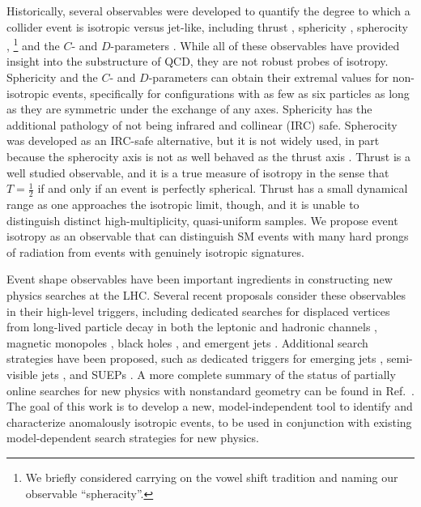 \documentclass[letterpaper,11pt]{article}
\DeclareRobustCommand{\Ref}[1]{Ref.~\cite{#1}}
\begin{document}
Historically, several observables were developed to quantify the degree to which a collider event is isotropic versus jet-like, including thrust \cite{Brandt:1964sa,Farhi:1977sg,DeRujula:1978vmq}, sphericity \cite{Bjorken:1969wi,Ellis:1976uc}, spherocity \cite{Georgi:1977sf},%
%
\footnote{We briefly considered carrying on the vowel shift tradition and naming our observable ``spheracity''.}
%
and the $C$- and $D$-parameters \cite{Parisi:1978eg,Donoghue:1979vi,Ellis:1980wv}.
%
While all of these observables have provided insight into the substructure of QCD, they are not robust probes of isotropy. 
%
Sphericity and the $C$- and $D$-parameters can obtain their extremal values for non-isotropic events, specifically for configurations with as few as six particles as long as they are symmetric under the exchange of any axes.
%
Sphericity has the additional pathology of not being infrared and collinear (IRC) safe.
%
Spherocity was developed as an IRC-safe alternative, but it is not widely used, in part because the spherocity axis is not as well behaved as the thrust axis \cite{Larkoski:2014uqa}. 
%
Thrust is a well studied observable, and it is a true measure of isotropy in the sense that $T = \frac{1}{2}$ if and only if an event is perfectly spherical.
%
Thrust has a small dynamical range as one approaches the isotropic limit, though, and it is unable to distinguish distinct high-multiplicity, quasi-uniform samples. 
%
We propose event isotropy as an observable that can distinguish SM events with many hard prongs of radiation from events with genuinely isotropic signatures.
 
 
Event shape observables have been important ingredients in constructing new physics searches at the LHC.
%
Several recent proposals consider these observables in their high-level triggers, including dedicated searches for displaced vertices from long-lived particle decay in both the leptonic and hadronic channels \cite{Aad:2013txa,Perrotta:2015jyu,Aaij:2017mic,Aaij:2016isa}, magnetic monopoles \cite{Aad:2015kta}, black holes \cite{Sirunyan:2018njd,Sirunyan:2017anm}, and emergent jets \cite{Sirunyan:2018njd}. 
%
Additional search strategies have been proposed, such as dedicated triggers for emerging jets \cite{Schwaller:2015gea}, semi-visible jets \cite{Cohen:2015toa}, and SUEPs \cite{Knapen:2016hky}. 
%
A more complete summary of the status of partially online searches for new physics with nonstandard geometry can be found in \Ref{Alimena:2019zri}. 
%
The goal of this work is to develop a new, model-independent tool to identify and characterize anomalously isotropic events, to be used in conjunction with existing model-dependent search strategies for new physics.
\end{document}
